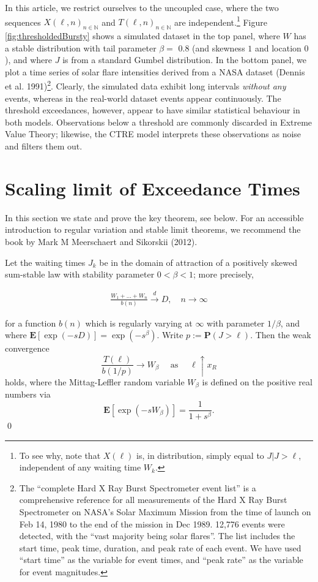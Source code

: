 \documentclass[smallextended]{svjour3}       %
\providecommand{\tightlist}{%
  \setlength{\itemsep}{0pt}\setlength{\parskip}{0pt}}
\begin{document}
In this article, we restrict ourselves to the uncoupled case, where the
two sequences \(X(\ell, n)_{n \in \mathbb N}\) and
\(T(\ell, n)_{n \in \mathbb N}\) are independent.\footnote{To see why,
  note that \(X(\ell)\) is, in distribution, simply equal to
  \(J | J > \ell\), independent of any waiting time \(W_k\).} Figure
\ref{fig:thresholdedBursty} shows a simulated dataset in the top panel,
where \(W\) has a stable distribution with tail parameter \(\beta =\)
0.8 (and skewness \(1\) and location \(0\)), and where \(J\) is from a
standard Gumbel distribution. In the bottom panel, we plot a time series
of solar flare intensities derived from a NASA dataset (Dennis et al.
1991)\footnote{The ``complete Hard X Ray Burst Spectrometer event list''
  is a comprehensive reference for all measurements of the Hard X Ray
  Burst Spectrometer on NASA's Solar Maximum Mission from the time of
  launch on Feb 14, 1980 to the end of the mission in Dec 1989. 12,776
  events were detected, with the ``vast majority being solar flares''.
  The list includes the start time, peak time, duration, and peak rate
  of each event. We have used ``start time'' as the variable for event
  times, and ``peak rate'' as the variable for event magnitudes.}.
Clearly, the simulated data exhibit long intervals \emph{without any}
events, whereas in the real-world dataset events appear continuously.
The threshold exceedances, however, appear to have similar statistical
behaviour in both models. Observations below a threshold are commonly
discarded in Extreme Value Theory; likewise, the CTRE model interprets
these observations as noise and filters them out.

\section{Scaling limit of Exceedance Times}\label{sec:scaling}

In this section we state and prove the key theorem, see below. For an
accessible introduction to regular variation and stable limit theorems,
we recommend the book by Mark M Meerschaert and Sikorskii (2012).

\begin{description}
\tightlist
\item[\textbf{Theorem:}]
Let the waiting times \(J_k\) be in the domain of attraction of a
positively skewed sum-stable law with stability parameter
\(0 < \beta < 1\); more precisely,

\begin{align} \label{eq:stability}
\frac{W_1 + \ldots + W_n}{b(n)} \overset{d}{\longrightarrow} D, 
\quad n \to \infty
\end{align}

for a function \(b(n)\) which is regularly varying at \(\infty\) with
parameter \(1/\beta\), and where
\(\mathbf E[\exp(-sD)] = \exp(-s^\beta)\). Write
\(p := \mathbf P(J > \ell)\). Then the weak convergence \[
\frac{T(\ell)} {b(1/p)} \to W_\beta \quad \text{ as } \quad \ell \uparrow x_R
\] holds, where the Mittag-Leffler random variable \(W_\beta\) is
defined on the positive real numbers via \[
\mathbf E[\exp(-sW_\beta)] = \frac{1}{1+s^\beta}.
\] \qed
\end{description}
\end{document}
